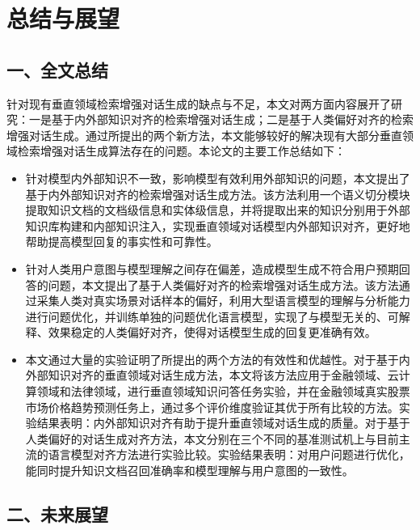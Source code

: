 \chapter{总结与展望}

\section*{一、全文总结}

针对现有垂直领域检索增强对话生成的缺点与不足，本文对两方面内容展开了研究：一是基于内外部知识对齐的检索增强对话生成；二是基于人类偏好对齐的检索增强对话生成。通过所提出的两个新方法，本文能够较好的解决现有大部分垂直领域检索增强对话生成算法存在的问题。本论文的主要工作总结如下：

\begin{itemize}[topsep = 0 pt, itemsep= 0 pt, parsep=0pt, partopsep=0pt, leftmargin=20pt, itemindent=0pt, labelsep=6pt, listparindent=24pt]
	\item 针对模型内外部知识不一致，影响模型有效利用外部知识的问题，本文提出了基于内外部知识对齐的检索增强对话生成方法。该方法利用一个语义切分模块提取知识文档的文档级信息和实体级信息，并将提取出来的知识分别用于外部知识库构建和内部知识注入，实现垂直领域对话模型内外部知识对齐，更好地帮助提高模型回复的事实性和可靠性。

	\item 针对人类用户意图与模型理解之间存在偏差，造成模型生成不符合用户预期回答的问题，本文提出了基于人类偏好对齐的检索增强对话生成方法。该方法通过采集人类对真实场景对话样本的偏好，利用大型语言模型的理解与分析能力进行问题优化，并训练单独的问题优化语言模型，实现了与模型无关的、可解释、效果稳定的人类偏好对齐，使得对话模型生成的回复更准确有效。
	
    \item 本文通过大量的实验证明了所提出的两个方法的有效性和优越性。对于基于内外部知识对齐的垂直领域对话生成方法，本文将该方法应用于金融领域、云计算领域和法律领域，进行垂直领域知识问答任务实验，并在金融领域真实股票市场价格趋势预测任务上，通过多个评价维度验证其优于所有比较的方法。实验结果表明：内外部知识对齐有助于提升垂直领域对话生成的质量。对于基于人类偏好的对话生成对齐方法，本文分别在三个不同的基准测试机上与目前主流的语言模型对齐方法进行实验比较。实验结果表明：对用户问题进行优化，能同时提升知识文档召回准确率和模型理解与用户意图的一致性。
\end{itemize}

\section*{二、未来展望}

